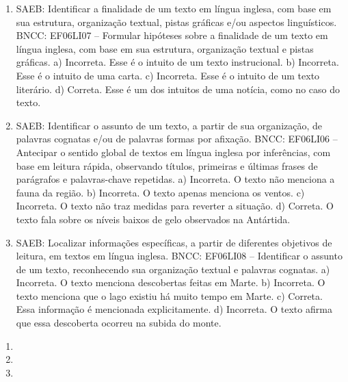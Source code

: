 
\begin{enumerate}
\item
SAEB: Identificar a finalidade de um texto em língua inglesa, com base
em sua estrutura, organização textual, pistas gráficas e/ou aspectos
linguísticos.
BNCC: EF06LI07 -- Formular hipóteses sobre a finalidade de um texto em
língua inglesa, com base em sua estrutura, organização textual e pistas
gráficas.
a) Incorreta. Esse é o intuito de um texto instrucional.
b) Incorreta. Esse é o intuito de uma carta.
c) Incorreta. Esse é o intuito de um texto literário.
d) Correta. Esse é um dos intuitos de uma notícia, como no caso do
texto.

\item
SAEB: Identificar o assunto de um texto, a partir de sua organização, de
palavras cognatas e/ou de palavras formas por afixação.
BNCC: EF06LI06 -- Antecipar o sentido global de textos em língua inglesa
por inferências, com base em leitura rápida, observando títulos,
primeiras e últimas frases de parágrafos e palavras-chave repetidas.
a) Incorreta. O texto não menciona a fauna da região.
b) Incorreta. O texto apenas menciona os ventos.
c) Incorreta. O texto não traz medidas para reverter a situação.
d) Correta. O texto fala sobre os níveis baixos de gelo observados na
Antártida.

\item
SAEB: Localizar informações específicas, a partir de diferentes
objetivos de leitura, em textos em língua inglesa.
BNCC: EF06LI08 -- Identificar o assunto de um texto, reconhecendo sua
organização textual e palavras cognatas.
a) Incorreta. O texto menciona descobertas feitas em Marte.
b) Incorreta. O texto menciona que o lago existiu há muito tempo em
Marte.
c) Correta. Essa informação é mencionada explicitamente.
d) Incorreta. O texto afirma que essa descoberta ocorreu na subida do
monte.
\end{enumerate}


\begin{enumerate}
\item

\item

\item
\end{enumerate}


